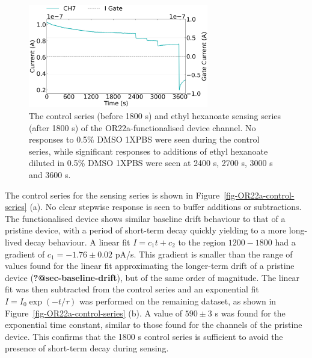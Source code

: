\documentclass[
  a4paper,
]{scrbook}
\begin{document}
\begin{figure}

{\centering \includegraphics[width=0.7\textwidth,height=\textheight]{figures/ch8/Q1C6.png}

}

\caption{\label{fig-EtHex-aqueous-sensing}The control series (before
1800 s) and ethyl hexanoate sensing series (after 1800 s) of the
OR22a-functionalised device channel. No responses to 0.5\% DMSO 1XPBS
were seen during the control series, while significant responses to
additions of ethyl hexanoate diluted in 0.5\% DMSO 1XPBS were seen at
2400 s, 2700 s, 3000 s and 3600 s.}

\end{figure}

The control series for the sensing series is shown in
Figure~\ref{fig-OR22a-control-series} (a). No clear stepwise response is
seen to buffer additions or subtractions. The functionalised device
shows similar baseline drift behaviour to that of a pristine device,
with a period of short-term decay quickly yielding to a more long-lived
decay behaviour. A linear fit \(I = c_1t + c_2\) to the region
\(1200-1800\) had a gradient of \(c_1 = -1.76\pm0.02\) pA/s. This
gradient is smaller than the range of values found for the linear fit
approximating the longer-term drift of a pristine device
(\textbf{?@sec-baseline-drift}), but of the same order of magnitude. The
linear fit was then subtracted from the control series and an
exponential fit \(I = I_0\exp(-t/\tau)\) was performed on the remaining
dataset, as shown in Figure~\ref{fig-OR22a-control-series} (b). A value
of \(590 \pm 3\) s was found for the exponential time constant, similar
to those found for the channels of the pristine device. This confirms
that the 1800 s control series is sufficient to avoid the presence of
short-term decay during sensing.
\end{document}

